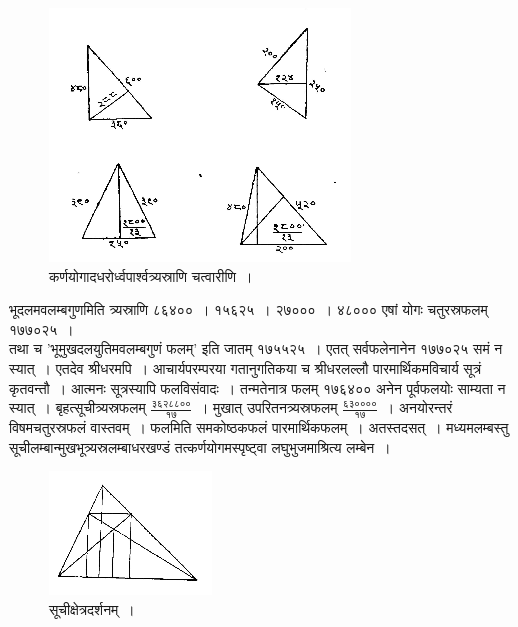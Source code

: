 \documentclass[11pt, openany]{book}
\begin{document}
\newpage

\begin{figure}[h!]
    \centering
   \captionsetup{labelformat=empty}
  \caption{कर्णयोगादधरोर्ध्वपार्श्वत्र्यस्राणि चत्वारीणि~।}
\vspace{-4mm}

    \includegraphics[scale=0.85]{graphics/capture72.png}
\end{figure}
\vspace{-2mm}

 भूदलमवलम्बगुणमिति त्र्यस्राणि ८६४००~। १५६२५~। २७०००~। 
४८००० एषां योगः चतुरस्रफलम् १७७०२५~। \\

\vspace{-2mm}
 तथा च 'भूमुखदलयुतिमवलम्बगुणं फलम्' इति जातम्
१७५५२५~। एतत् सर्वफलेनानेन १७७०२५ समं न स्यात्~। 
एतदेव श्रीधरमपि~। आचार्यपरम्परया गतानुगतिकया च श्रीधरलल्लौ पारमार्थिकमविचार्य सूत्रं कृतवन्तौ~। आत्मनः सूत्रस्यापि
फलविसंवादः~। तन्मतेनात्र फलम् १७६४०० अनेन पूर्वफलयोः
साम्यता न स्यात्~। बृहत्सूचीत्र्यस्रफलम् 
$\frac{\mbox{३६२८८००}}{\mbox{१७}}$~। मुखात् उपरितनत्र्यस्रफलम् $\frac{\mbox{६३००००}}{\mbox{१७}}$~। अनयोरन्तरं विषमचतुरस्रफलं
वास्तवम्~। फलमिति समकोष्ठकफलं पारमार्थिकफलम्~। अतस्तदसत्~। मध्यमलम्बस्तु सूचीलम्बान्मुखभूत्र्यस्रलम्बाधरखण्डं
तत्कर्णयोगमस्पृष्ट्वा लघुभुजमाश्रित्य लम्बेन~। 
\newpage
\begin{figure}[h!]
    \centering
   \captionsetup{labelformat=empty}
  \caption{\hspace{-5mm} सूचीक्षेत्रदर्शनम्~।}
\vspace{-4mm}

    \includegraphics[scale=0.85]{graphics/capture73.png}
\end{figure}
\vspace{-2mm}
\end{document}
